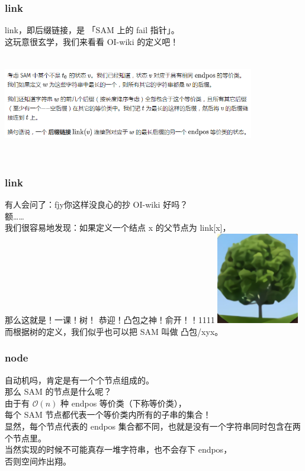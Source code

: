\documentclass{beamer}
\begin{document}
    \begin{frame}
        \frametitle{link}
        link，即后缀链接，是 「SAM 上的 fail 指针」。\\
        这玩意很玄学，我们来看看 OI-wiki 的定义吧！\\
        \includegraphics[height=5cm,width=11cm]{g3.png}
    \end{frame}

    \begin{frame}
        \frametitle{link}
        有人会问了：fjy你这样没良心的抄 OI-wiki 好吗？\\
        额……\\
        我们很容易地发现：如果定义一个结点 x 的父节点为 link[x]，\\
        那么这就是！一课！树！
        \pause
        恭迎！凸包之神！俞开！！1111
        \pause
        \includegraphics[height=4cm]{g5.png} 
        而根据树的定义，我们似乎也可以把 SAM 叫做 凸包/xyx。
    \end{frame}

    \begin{frame}
        \frametitle{node}
        自动机吗，肯定是有一个个节点组成的。\\
        那么 SAM 的节点是什么呢？\\
        由于有 $\mathcal{O}(n)$ 种 endpos 等价类（下称等价类），\\
        每个 SAM 节点都代表一个等价类内所有的子串的集合！\\
        显然，每个节点代表的 endpos 集合都不同，也就是没有一个字符串同时包含在两个节点里。\\
        当然实现的时候不可能真存一堆字符串，也不会存下 endpos，\\
        否则空间炸出翔。
    \end{frame}
\end{document}
